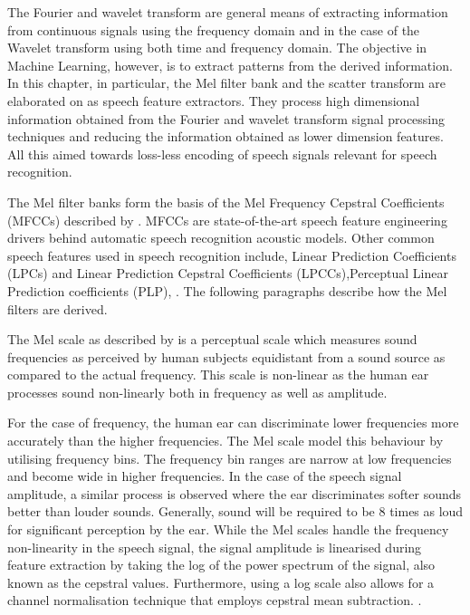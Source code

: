 The Fourier and wavelet transform are general means of extracting information from continuous signals using the frequency domain and in the case of the Wavelet transform using both time and frequency domain.  The objective in Machine Learning, however, is to extract patterns from the derived information.  In this chapter, in particular, the Mel filter bank and the scatter transform are elaborated on as speech feature extractors.  They process high dimensional information obtained from the Fourier and wavelet transform signal processing techniques and reducing the information obtained as lower dimension features.  All this aimed towards loss-less encoding of speech signals relevant for speech recognition.

The Mel filter banks form the basis of the Mel Frequency Cepstral Coefficients (MFCCs) described by \citep{davis1980comparison}.  MFCCs are state-of-the-art speech feature engineering drivers behind automatic speech recognition acoustic models.  Other common speech features used in speech recognition include, Linear Prediction Coefficients (LPCs) and Linear Prediction Cepstral Coefficients (LPCCs),Perceptual Linear Prediction coefficients (PLP),  \citep{mcloughlin2009applied, dines2010measuring}.  The following paragraphs describe how the Mel filters are derived. 

The Mel scale as described by \cite{stevens1937scale} is a perceptual scale which measures sound frequencies as perceived by human subjects equidistant from a sound source as compared to the actual frequency.  This scale is non-linear as the human ear processes sound non-linearly both in frequency as well as amplitude.

For the case of frequency, the human ear can discriminate lower frequencies more accurately than the higher frequencies.  The Mel scale model this behaviour by utilising frequency bins.  The frequency bin ranges are narrow at low frequencies and become wide in higher frequencies. In the case of the speech signal amplitude, a similar process is observed where the ear discriminates softer sounds better than louder sounds.  Generally, sound will be required to be 8 times as loud for significant perception by the ear.  While the Mel scales handle the frequency non-linearity in the speech signal, the signal amplitude is linearised during feature extraction by taking the log of the power spectrum of the signal, also known as the cepstral values.  Furthermore, using a log scale also allows for a channel normalisation technique that employs cepstral mean subtraction. \citep{becchetti1999behaviour}.

